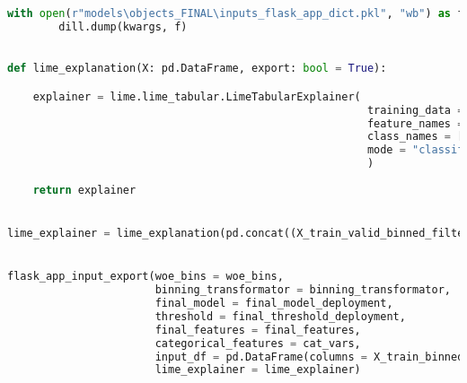 \begin{lstlisting}[language=Python, basicstyle=\footnotesize\ttfamily]
    with open(r"models\objects_FINAL\inputs_flask_app_dict.pkl", "wb") as f:
        dill.dump(kwargs, f)
		

def lime_explanation(X: pd.DataFrame, export: bool = True):

    explainer = lime.lime_tabular.LimeTabularExplainer(
                                                        training_data = np.array(X),
                                                        feature_names = X.columns,
                                                        class_names = ["non-default", "default"],
                                                        mode = "classification"
                                                        )
    
    return explainer


lime_explainer = lime_explanation(pd.concat((X_train_valid_binned_filtered, X_test_binned_filtered)))


flask_app_input_export(woe_bins = woe_bins,
                       binning_transformator = binning_transformator,
                       final_model = final_model_deployment,
                       threshold = final_threshold_deployment,
                       final_features = final_features,
                       categorical_features = cat_vars,
                       input_df = pd.DataFrame(columns = X_train_binned.columns),
                       lime_explainer = lime_explainer)
\end{lstlisting}

